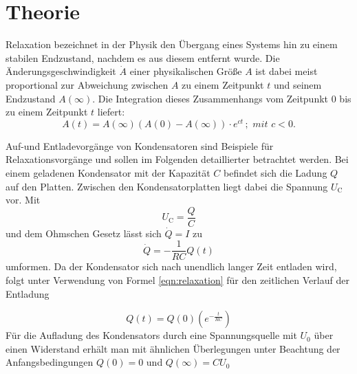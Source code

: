 \section{Theorie}
\label{sec:Theorie}
Relaxation bezeichnet in der Physik den Übergang eines Systems hin zu einem stabilen Endzustand, nachdem es aus diesem entfernt wurde.
Die Änderungsgeschwindigkeit $\dot{A}$ einer physikalischen Größe $A$ ist dabei meist proportional zur Abweichung zwischen $A$ zu einem Zeitpunkt $t$ und seinem Endzustand $A(\infty)$.
Die Integration dieses Zusammenhangs vom Zeitpunkt $0$ bis zu einem Zeitpunkt $t$ liefert:
\begin{equation}
	\label{eqn:relaxation}
	A(t)=A(\infty) (  A(0)-A(\infty) ) \cdot e^{ct}\, ;\,\, mit\,\, c<0 .
\end{equation}

Auf-und Entladevorgänge von Kondensatoren sind Beispiele für Relaxationsvorgänge und sollen im Folgenden detaillierter betrachtet werden.
Bei einem geladenen Kondensator mit der Kapazität $C$ befindet sich die Ladung $Q$ auf den Platten.
Zwischen den Kondensatorplatten liegt dabei die Spannung $U_\text{C}$ vor. Mit
\begin{equation*}
	U_\text{C}=\frac{Q}{C}
\end{equation*}
und dem Ohmschen Gesetz lässt sich $\dot{Q}=I$ zu
\begin{equation}
	\dot{Q}=-\frac{1}{RC}Q(t)
\end{equation}
umformen.
Da der Kondensator sich nach unendlich langer Zeit entladen wird, folgt unter Verwendung von Formel \eqref{eqn:relaxation} für den zeitlichen Verlauf der Entladung

\begin{equation}
	\label{eqn:aufladung}
	Q(t)=Q(0)(e^{-\frac{t}{RC}})
\end{equation}
Für die Aufladung des Kondensators durch eine Spannungsquelle mit $U_0$ über einen Widerstand erhält man mit ähnlichen Überlegungen unter Beachtung der Anfangsbedingungen $Q(0)=0$ und $Q(\infty)=CU_\text{0}$

